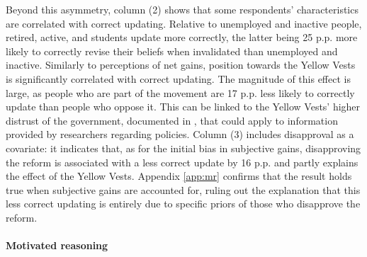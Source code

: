 \documentclass[12pt]{article} %
\providecommand{\DIFaddtex}[1]{{\protect\color{blue}\uwave{#1}}} %
\providecommand{\DIFaddbegin}{} %
\providecommand{\DIFaddend}{} %
\providecommand{\DIFadd}[1]{\texorpdfstring{\DIFaddtex{#1}}{#1}} %
\newcommand{\DIFaddincludegraphics}[2][]{{\color{blue}\fbox{\DIFOincludegraphics[#1]{#2}}}} %
\DeclareRobustCommand{\DIFaddbegin}{\DIFOaddbegin \let\includegraphics\DIFaddincludegraphics} %
\DeclareRobustCommand{\DIFaddend}{\DIFOaddend \let\includegraphics\DIFOincludegraphics} %
\begin{document}


Beyond this asymmetry, column (2) shows that some respondents' characteristics are correlated with correct updating. Relative to unemployed and inactive people, retired, active, and students update more correctly, the latter being 25 p.p. more likely to correctly revise their beliefs when invalidated than unemployed and inactive. Similarly to perceptions of net gains, position towards the Yellow Vests is significantly correlated with correct updating. The magnitude of this effect is large, as people who are part of the movement are 17 p.p. less likely to correctly update than people who oppose it. This can be linked to the Yellow Vests' higher distrust of the government, documented in \citet{algan_et_al_19}, that could apply to information provided by researchers regarding policies. Column (3) includes disapproval as a covariate: it indicates that, as for the initial bias in subjective gains, disapproving the reform is associated with a less correct update by 16 p.p. and partly explains the effect of the Yellow Vests. Appendix \ref{app:mr} confirms that the result holds true when \DIFaddbegin \DIFadd{initial }\DIFaddend subjective gains are accounted for, ruling out the explanation that this less correct updating is entirely due to specific priors of those who disapprove the reform. 

\paragraph{Motivated reasoning} %

\end{document}
